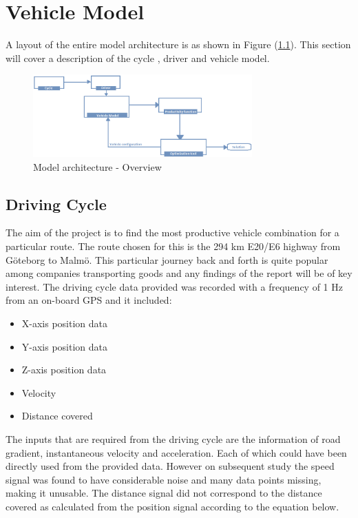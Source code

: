 \documentclass[ExampleMasters.tex]{subfiles}
\begin{document}
\chapter{Vehicle Model}

\lipsum 
A layout of the entire model architecture is as shown in Figure (\ref{fig:architecture}). This section will cover a description of the cycle , driver and vehicle model. \\

\begin{figure}[ht!]
	\begin{center}
		\includegraphics[width=0.75\textwidth]{figures/VehicleModel/architecture2.png}
	\end{center}
	\caption{Model architecture - Overview}
	\label{fig:architecture}
\end{figure}

\section{Driving Cycle}
\label{sec:drivingcycle}
The aim of the project is to find the most productive vehicle combination for a particular route. The route chosen for this is the 294 km E20/E6 highway from G\"oteborg to Malm\"o. This particular journey back and forth is quite popular among companies transporting goods and any findings of the report will be of key interest. 
The driving cycle data provided was recorded with a frequency of 1 Hz from an on-board GPS and it included:
\begin{itemize}
\item X-axis position data
\item Y-axis position data
\item Z-axis position data
\item Velocity
\item Distance covered
\end{itemize}

The inputs that are required from the driving cycle are the information of road gradient, instantaneous velocity and acceleration. Each of which could have been directly used from the provided data. However on subsequent study the speed signal was found to have considerable noise and many data points missing, making it unusable. The distance signal did not correspond to the distance covered as calculated from the position signal according to the equation below.
\end{document}
